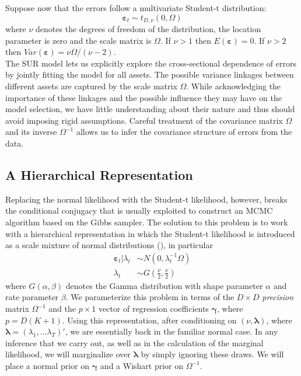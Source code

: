 \documentclass[12pt]{article}
\begin{document}
Suppose now that the errors follow a multivariate Student-t distribution: 
\begin{equation*}
\boldsymbol{\varepsilon}_{t}\sim t_{D,\nu }\left( 0,\Omega \right)
\end{equation*}
where $\nu$ denotes the degrees of freedom of the distribution, the location parameter is zero and the scale matrix is $\Omega$.
If $\nu >1$ then $E(\boldsymbol{\varepsilon}) = 0$. 
If $\nu>2$ then $Var\left( \boldsymbol{\varepsilon} \right) = \nu \Omega/(\nu-2)$. \\
The SUR model lets us explicitly explore the cross-sectional dependence of errors by jointly fitting the model for all assets. The possible variance linkages between different assets are captured by the scale matrix $\Omega$. While acknowledging the importance of these linkages and the possible influence they may have on the model selection, we have little understanding about their nature and thus should avoid imposing rigid assumptions. Careful treatment of the covariance matrix $\Omega$ and its inverse $\Omega^{-1}$ allows us to infer the covariance structure of errors from the data.
\subsection{A Hierarchical Representation}
Replacing the normal likelihood with the Student-t likelihood, however, breaks the conditional conjugacy that is usually exploited to construct an MCMC algorithm based on the Gibbs sampler.
The solution to this problem is to work with a hierarchical representation in which the Student-t likelihood is introduced as a scale mixture of normal distributions (\cite{chib1995hierarchical}), in particular
\begin{align*}
\boldsymbol{\varepsilon}_{t}|\lambda _{t} &\sim N\left( 0,\lambda _{t}^{-1}\Omega \right)
\\
\lambda _{t} &\sim G\left( \frac{\nu }{2},\frac{\nu }{2}\right)
\end{align*}
where $G(\alpha,\beta)$ denotes the Gamma distribution with shape parameter $\alpha$ and rate parameter $\beta$. We parameterize this problem in terms of the $D\times D$ \emph{precision} matrix $\Omega^{-1}$ and the $p\times1$ vector of regression coefficients $\boldsymbol{\gamma}$, where $p = D(K+1)$. 
Using this representation, after conditioning on $\left( \nu, \boldsymbol{\lambda} \right)$, where $\boldsymbol{\lambda} = (\lambda_1, \dots \lambda_T)'$, we are essentially back in the familiar normal case.
In any inference that we carry out, as well as in the calculation of the marginal likelihood, we will marginalize over $\boldsymbol{\lambda}$ by simply ignoring these draws.
We will place a normal prior on $\boldsymbol{\gamma}$ and a Wishart prior on $\Omega^{-1}$. 
\end{document}
